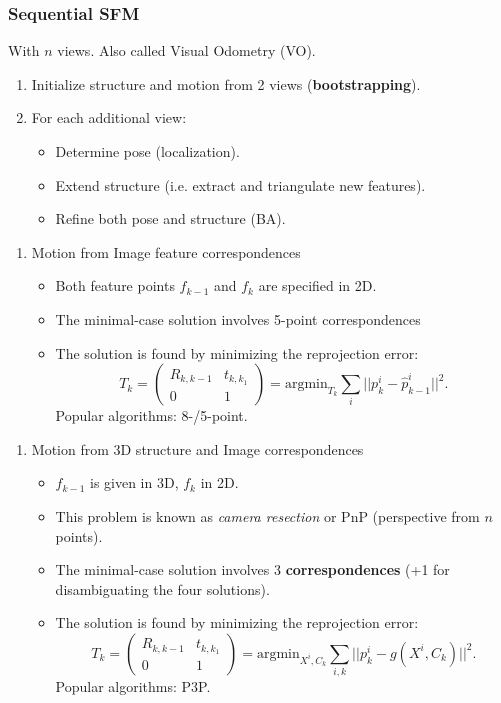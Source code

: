 \documentclass[a4paper,12 pt]{article}
\theoremstyle{definition}
\theoremstyle{remark}
\theoremstyle{definition}
\theoremstyle{definition}
\theoremstyle{definition}
\theoremstyle{remark}
\theoremstyle{definition}
\begin{document}
\subsubsection*{Sequential SFM}
With $n$ views. Also called Visual Odometry (VO). 
\begin{enumerate}
\item Initialize structure and motion from 2 views (\textbf{bootstrapping}).
\item For each additional view:
\begin{itemize}
\item Determine pose (localization).
\item Extend structure (i.e. extract and triangulate new features).
\item Refine both pose and structure (BA).
\end{itemize}
\end{enumerate}
\begin{enumerate}[\textbf{2D to 2D}]
\item Motion from Image feature correspondences 
\begin{itemize}
\item Both feature points $f_{k-1}$ and $f_k$ are specified in 2D.
\item The minimal-case solution involves 5-point correspondences
\item The solution is found by minimizing the reprojection error:
\begin{equation}
T_k=\begin{pmatrix}
R_{k,k-1} & t_{k,k_1}\\
0&1
\end{pmatrix}=\text{argmin}_{T_k}\sum_{i}||p_k^i-\hat{p}_{k-1}^i||^2.
\end{equation}
Popular algorithms: 8-/5-point.
\end{itemize}
\end{enumerate}
\begin{enumerate}[\textbf{3D to 2D}]
\item Motion from 3D structure and Image correspondences
\begin{itemize}
\item $f_{k-1}$ is given in 3D, $f_k$ in 2D.
\item This problem is known as \textit{camera resection} or PnP (perspective from $n$ points).
\item The minimal-case solution involves 3 \textbf{correspondences} (+1 for disambiguating the four solutions).
\item The solution is found by minimizing the reprojection error:
\begin{equation}
T_k=\begin{pmatrix}
R_{k,k-1} & t_{k,k_1}\\
0&1
\end{pmatrix}=\text{argmin}_{X^i,C_k}\sum_{i,k}||p_k^i-g(X^i,C_k)||^2.
\end{equation}
Popular algorithms: P3P.
\end{itemize}
\end{enumerate}
\end{document}
